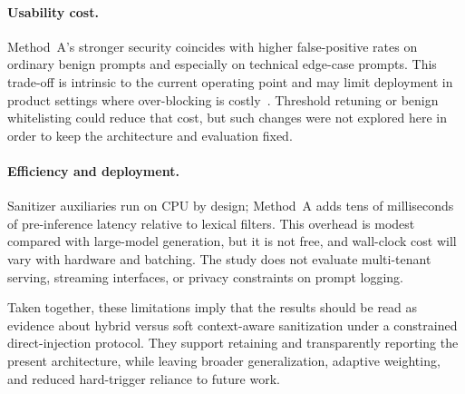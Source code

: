 \paragraph{Usability cost.}
Method~A's stronger security coincides with higher false-positive rates on ordinary benign prompts and especially on technical edge-case prompts.
This trade-off is intrinsic to the current operating point and may limit deployment in product settings where over-blocking is costly~\cite{bair2025prompt,kholkar2025capture}.
Threshold retuning or benign whitelisting could reduce that cost, but such changes were not explored here in order to keep the architecture and evaluation fixed.

\paragraph{Efficiency and deployment.}
Sanitizer auxiliaries run on CPU by design; Method~A adds tens of milliseconds of pre-inference latency relative to lexical filters.
This overhead is modest compared with large-model generation, but it is not free, and wall-clock cost will vary with hardware and batching.
The study does not evaluate multi-tenant serving, streaming interfaces, or privacy constraints on prompt logging.

Taken together, these limitations imply that the results should be read as evidence about hybrid versus soft context-aware sanitization under a constrained direct-injection protocol.
They support retaining and transparently reporting the present architecture, while leaving broader generalization, adaptive weighting, and reduced hard-trigger reliance to future work.
